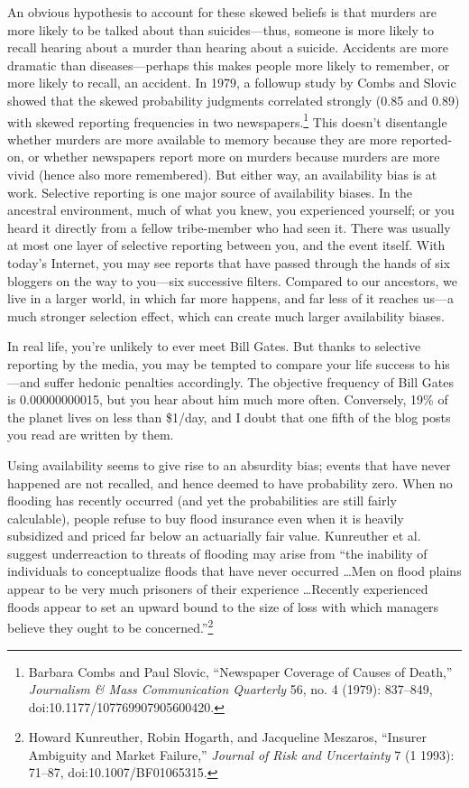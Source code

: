 {
 An obvious hypothesis to account for these skewed beliefs is that
murders are more likely to be talked about than suicides---thus,
someone is more likely to recall hearing about a murder than hearing
about a suicide. Accidents are more dramatic than diseases---perhaps
this makes people more likely to remember, or more likely to recall, an
accident. In 1979, a followup study by Combs and Slovic showed that the
skewed probability judgments correlated strongly (0.85 and 0.89) with
skewed reporting frequencies in two newspapers.\footnote{Barbara Combs and Paul Slovic, ``Newspaper
Coverage of Causes of Death,'' \textit{Journalism \&
Mass Communication Quarterly} 56, no. 4 (1979): 837--849,
doi:10.1177/107769907905600420.} This
doesn't disentangle whether murders are more available
to memory because they are more reported-on, or whether newspapers
report more on murders because murders are more vivid (hence also more
remembered). But either way, an availability bias is at work. Selective
reporting is one major source of availability biases. In the ancestral
environment, much of what you knew, you experienced yourself; or you
heard it directly from a fellow tribe-member who had seen it. There was
usually at most one layer of selective reporting between you, and the
event itself. With today's Internet, you may see
reports that have passed through the hands of six bloggers on the way
to you---six successive filters. Compared to our ancestors, we live in
a larger world, in which far more happens, and far less of it reaches
us---a much stronger selection effect, which can create much larger
availability biases.}

{
 In real life, you're unlikely to ever meet Bill
Gates. But thanks to selective reporting by the media, you may be
tempted to compare your life success to his---and suffer hedonic
penalties accordingly. The objective frequency of Bill Gates is
0.00000000015, but you hear about him much more often. Conversely, 19\%
of the planet lives on less than \$1/day, and I doubt that one fifth of
the blog posts you read are written by them.}

{
 Using availability seems to give rise to an absurdity bias; events
that have never happened are not recalled, and hence deemed to have
probability zero. When no flooding has recently occurred (and yet the
probabilities are still fairly calculable), people refuse to buy flood
insurance even when it is heavily subsidized and priced far below an
actuarially fair value. Kunreuther et al. suggest underreaction to
threats of flooding may arise from ``the inability of
individuals to conceptualize floods that have never occurred \ldots Men
on flood plains appear to be very much prisoners of their experience
\ldots Recently experienced floods appear to set an upward bound to the
size of loss with which managers believe they ought to be
concerned.''\footnote{Howard Kunreuther, Robin Hogarth, and Jacqueline Meszaros,
``Insurer Ambiguity and Market
Failure,'' \textit{Journal of Risk and Uncertainty} 7
(1 1993): 71--87, doi:10.1007/BF01065315.}}

